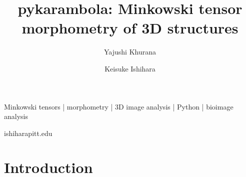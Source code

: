 \documentclass[times, twoside, watermark]{zHenriquesLab-StyleBioRxiv}
\begin{document}
\title{pykarambola: Minkowski tensor morphometry of 3D structures}

\author[1]{Yajushi Khurana}
\author[1,\Letter]{Keisuke Ishihara}

\maketitle

\begin{abstract}
\end{abstract}

\begin{keywords}
Minkowski tensors | morphometry | 3D image analysis | Python | bioimage analysis
\end{keywords}

\begin{corrauthor}
ishihara\at pitt.edu
\end{corrauthor}


\section*{Introduction}

\end{document}
